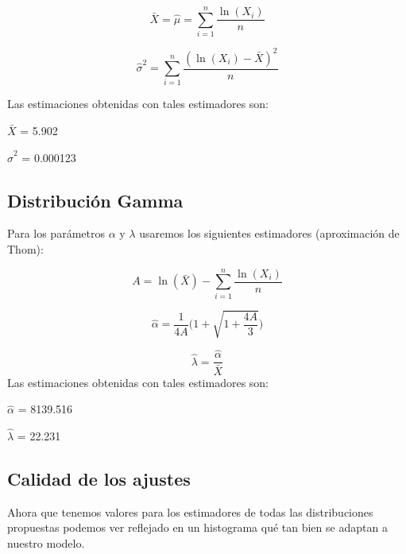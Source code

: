 \documentclass[a4paper,10pt]{article}
\begin{document}
\[\bar{X} = \hat{\mu} = \sum\limits_{i=1}^n \frac{\ln{(X_i)}}{n}\]


\[\hat{\sigma}^2 = \sum\limits_{i=1}^n \frac{(\ln{(X_i)} - \bar{X})^2}{n}\]

\vspace{0.4in}
Las estimaciones obtenidas con tales estimadores son:
\vspace{0.4in}


$\bar{X}$ = 5.902

\vspace{0.1in}
$\hat{\sigma}^2$ = 0.000123

\pagebreak


\subsection*{Distribución Gamma}
Para los parámetros $\alpha$ y $\lambda$ usaremos los siguientes estimadores (aproximación de Thom):

\vspace{0.4in}

\[A = \ln{(\bar{X})} - \sum\limits_{i=1}^n \frac{\ln{(X_i)}}{n}\]


\[\hat{\alpha} = \frac{1}{4A}\bigg(1 + \sqrt{1 + \frac{4A}{3}}\bigg)\]

\[\hat{\lambda}=\frac{\hat{\alpha}}{\bar{X}}\]
\vspace{0.4in}
Las estimaciones obtenidas con tales estimadores son:
\vspace{0.1in}


$\hat{\alpha}$ = 8139.516

\vspace{0.1in}
$\hat{\lambda}$ = 22.231


\subsection*{Calidad de los ajustes}

Ahora que tenemos valores para los estimadores de todas las distribuciones propuestas
podemos ver reflejado en un histograma qué tan bien se adaptan a nuestro modelo.

\begin{figure}[hbt]
\noindent{}
\end{figure}
\end{document}
